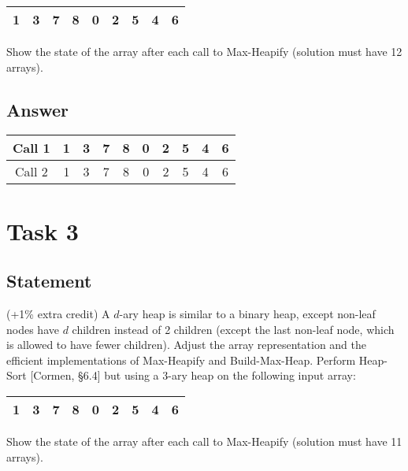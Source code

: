 \documentclass{article}
\begin{document}
\begin{table}[!h]
    \centering
    \begin{tabular}{|c|c|c|c|c|c|c|c|c|}
        \hline
        1 & 3 & 7 & 8 & 0 & 2 & 5 & 4 & 6 \\
        \hline
    \end{tabular}
\end{table}

Show the state of the array after each call to Max-Heapify (solution must have 12 arrays).

\subsection{Answer}

\begin{table}[!h]
    \centering
    \begin{tabular}{|c||c|c|c|c|c|c|c|c|c|}
        \hline
        Call 1 & 1 & 3 & 7 & 8 & 0 & 2 & 5 & 4 & 6 \\
        \hline
        Call 2 & 1 & 3 & 7 & 8 & 0 & 2 & 5 & 4 & 6 \\
        \hline
    \end{tabular}
\end{table}


\section{Task 3}
\subsection{Statement}
(+1\% extra credit) A $d$-ary heap is similar to a binary heap, except non-leaf nodes have $d$ children instead of 2 children (except the last non-leaf node, which is allowed to have fewer children). Adjust the array representation and the efficient implementations of Max-Heapify and Build-Max-Heap. Perform Heap-Sort [Cormen, §6.4] but using a 3-ary heap on the following input array:

\begin{table}[!h]
    \centering
    \begin{tabular}{|c|c|c|c|c|c|c|c|c|}
        \hline
        1 & 3 & 7 & 8 & 0 & 2 & 5 & 4 & 6 \\
        \hline
    \end{tabular}
\end{table}

Show the state of the array after each call to Max-Heapify (solution must have 11 arrays).
\end{document}
